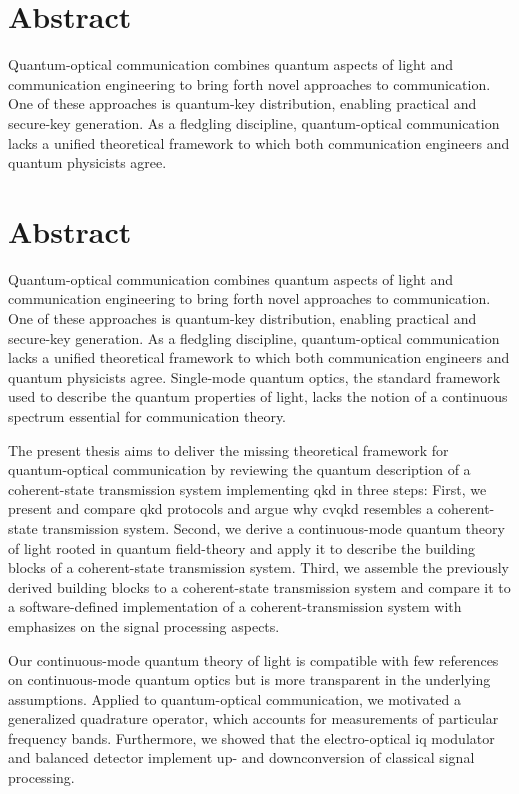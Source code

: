 \section*{Abstract}

Quantum-optical communication combines quantum aspects of light and communication engineering to bring forth novel approaches to communication.
One of these approaches is quantum-key distribution, enabling practical and secure-key generation.
As a fledgling discipline, quantum-optical communication lacks a unified theoretical framework to which both communication engineers and quantum physicists agree.
\section*{Abstract}

Quantum-optical communication combines quantum aspects of light and communication engineering to bring forth novel approaches to communication.
One of these approaches is quantum-key distribution, enabling practical and secure-key generation.
As a fledgling discipline, quantum-optical communication lacks a unified theoretical framework to which both communication engineers and quantum physicists agree.
Single-mode quantum optics, the standard framework used to describe the quantum properties of light, lacks the notion of a continuous spectrum essential for communication theory.

The present thesis aims to deliver the missing theoretical framework for quantum-optical communication by reviewing the quantum description of a coherent-state transmission system implementing \gls{qkd} in three steps:
First, we present and compare \gls{qkd} protocols and argue why \gls{cvqkd} resembles a coherent-state transmission system.
Second, we derive a continuous-mode quantum theory of light rooted in quantum field-theory and apply it to describe the building blocks of a coherent-state transmission system.
Third, we assemble the previously derived building blocks to a coherent-state transmission system and compare it to a software-defined implementation of a coherent-transmission system with emphasizes on the signal processing aspects.

Our continuous-mode quantum theory of light is compatible with few references on continuous-mode quantum optics but is more transparent in the underlying assumptions.
Applied to quantum-optical communication, we motivated a generalized quadrature operator, which accounts for measurements of particular frequency bands.
Furthermore, we showed that the electro-optical \gls{iq} modulator and balanced detector implement up- and downconversion of classical signal processing.

